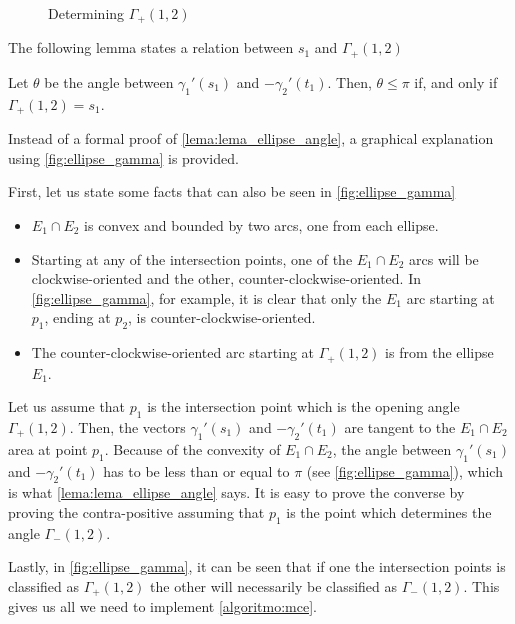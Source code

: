 \begin{figure}[H]
\centering

    \caption{Determining $\Gamma_+(1,2)$}
    
    \fautor
\end{figure}

The following lemma states a relation between $s_1$ and $\Gamma_+(1,2)$

\begin{lema}\label{lema:lema_ellipse_angle}
	Let $\theta$ be the angle between $\gamma_1'(s_1)$ and $-\gamma_2'(t_1)$. Then, $\theta \le \pi$ if, and only if $\Gamma_+(1,2)=s_1$.
\end{lema}

Instead of a formal proof of \autoref{lema:lema_ellipse_angle}, a graphical explanation using \autoref{fig:ellipse_gamma} is provided.


First, let us state some facts that can also be seen in \autoref{fig:ellipse_gamma}

\begin{itemize}
    \item $E_1 \cap E_2$ is convex and bounded by two arcs, one from each ellipse.
    \item Starting at any of the intersection points, one of the $E_1 \cap E_2$ arcs will be clockwise-oriented and the other, counter-clockwise-oriented. In \autoref{fig:ellipse_gamma}, for example, it is clear that only the $E_1$ arc starting at $p_1$, ending at $p_2$, is counter-clockwise-oriented.  
    
    
    \item The counter-clockwise-oriented arc starting at $\Gamma_+(1,2)$ is from the ellipse $E_1$.
\end{itemize}


Let us assume that $p_1$ is the intersection point which is the opening angle $\Gamma_+(1,2)$. Then, the vectors $\gamma_1'(s_1)$ and $-\gamma_2'(t_1)$ are tangent to the $E_1 \cap E_2$ area at point $p_1$. Because of the convexity of $E_1 \cap E_2$, the angle between $\gamma_1'(s_1)$ and $-\gamma_2'(t_1)$ has to be less than or equal to $\pi$ (see \autoref{fig:ellipse_gamma}), which is what \autoref{lema:lema_ellipse_angle} says. It is easy to prove the converse by proving the contra-positive assuming that $p_1$ is the point which determines the angle $\Gamma_-(1,2)$.

Lastly, in \autoref{fig:ellipse_gamma}, it can be seen that if one the intersection points is classified as $\Gamma_+(1,2)$ the other will necessarily be classified as $\Gamma_-(1,2)$. This gives us all we need to implement \autoref{algoritmo:mce}.


